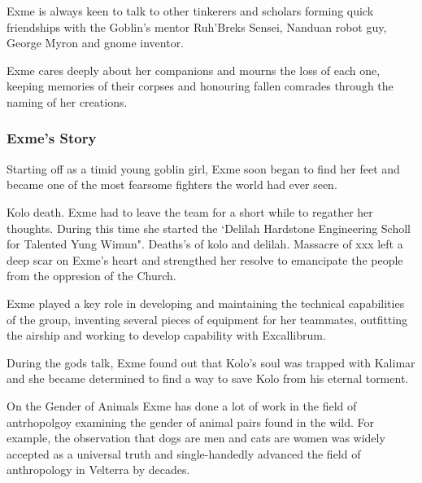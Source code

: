 Exme is always keen to talk to other tinkerers and scholars forming quick friendships with the Goblin's mentor Ruh'Breks Sensei, Nanduan robot guy, George Myron and gnome inventor.  

Exme cares deeply about her companions and mourns the loss of each one, keeping memories of their corpses and honouring fallen comrades through the naming of her creations.  

\subsubsection{Exme's Story}

Starting off as a timid young goblin girl, Exme soon began to find her feet and became one of the most fearsome fighters the world had ever seen.  

Kolo death. Exme had to leave the team for a short while to regather her thoughts.  During this time she started the `Delilah Hardstone Engineering Scholl for Talented Yung Wimun".    Deaths's of kolo and delilah.  Massacre of xxx left a deep scar on Exme's heart and strengthed her resolve to emancipate the people from the oppresion of the Church.  

Exme played a key role in developing and maintaining the technical capabilities of the group, inventing several pieces of equipment for her teammates, outfitting the airship and working to develop capability with Excallibrum.  

During the gods talk, Exme found out that Kolo's soul was trapped with Kalimar and she became determined to find a way to save Kolo from his eternal torment.  

\begin{DndSidebar}{On the Gender of Animals}
Exme has done a lot of work in the field of antrhopolgoy examining the gender of animal pairs found in the wild.  For example, the observation that dogs are men and cats are women was widely accepted as a universal truth and single-handedly advanced the field of anthropology in Velterra by decades.  
\end{DndSidebar}

\smallskip

\bigskip


\clearpage